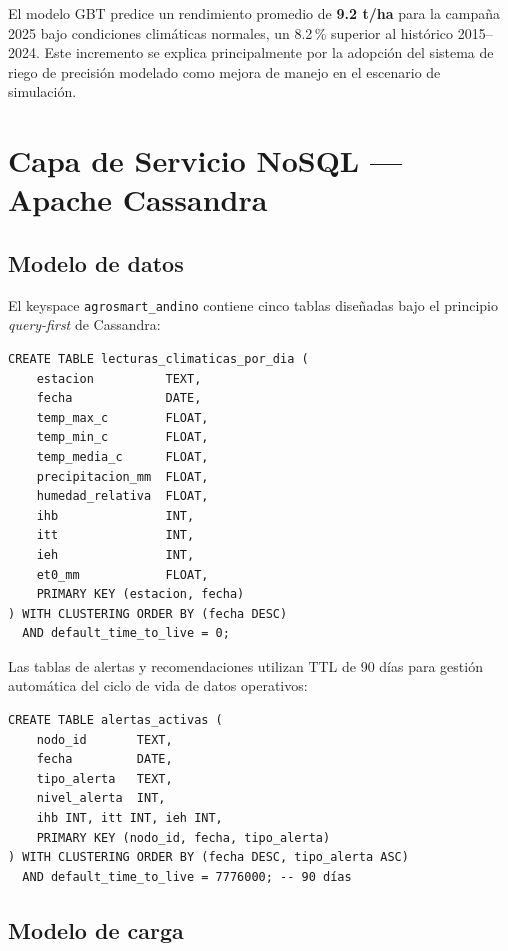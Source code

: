 \documentclass[12pt,a4paper]{article}
\begin{document}
El modelo GBT predice un rendimiento promedio de \textbf{9.2 t/ha} para
la campaña 2025 bajo condiciones climáticas normales, un 8.2\,\% superior
al histórico 2015--2024. Este incremento se explica principalmente por la
adopción del sistema de riego de precisión modelado como mejora de
manejo en el escenario de simulación.

\section{Capa de Servicio NoSQL — Apache Cassandra}

\subsection{Modelo de datos}

El keyspace \texttt{agrosmart\_andino} contiene cinco tablas diseñadas
bajo el principio \textit{query-first} de Cassandra:

\begin{lstlisting}[style=sqlstyle, caption={Tabla de lecturas climáticas}]
CREATE TABLE lecturas_climaticas_por_dia (
    estacion          TEXT,
    fecha             DATE,
    temp_max_c        FLOAT,
    temp_min_c        FLOAT,
    temp_media_c      FLOAT,
    precipitacion_mm  FLOAT,
    humedad_relativa  FLOAT,
    ihb               INT,
    itt               INT,
    ieh               INT,
    et0_mm            FLOAT,
    PRIMARY KEY (estacion, fecha)
) WITH CLUSTERING ORDER BY (fecha DESC)
  AND default_time_to_live = 0;
\end{lstlisting}

Las tablas de alertas y recomendaciones utilizan TTL de 90 días para
gestión automática del ciclo de vida de datos operativos:

\begin{lstlisting}[style=sqlstyle, caption={Tabla de alertas activas con TTL}]
CREATE TABLE alertas_activas (
    nodo_id       TEXT,
    fecha         DATE,
    tipo_alerta   TEXT,
    nivel_alerta  INT,
    ihb INT, itt INT, ieh INT,
    PRIMARY KEY (nodo_id, fecha, tipo_alerta)
) WITH CLUSTERING ORDER BY (fecha DESC, tipo_alerta ASC)
  AND default_time_to_live = 7776000; -- 90 días
\end{lstlisting}

\subsection{Modelo de carga}
\end{document}
